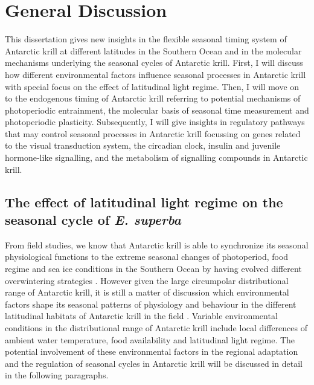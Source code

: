 
\chapter{General Discussion} %

\label{Discussion} %

This dissertation gives new insights in the flexible seasonal timing system of
Antarctic krill at different latitudes in the Southern Ocean and in the
molecular mechanisms underlying the seasonal cycles of Antarctic krill. First,
I will discuss how different environmental factors influence seasonal processes
in Antarctic krill with special focus on the effect of latitudinal light
regime. Then, I will move on to the endogenous timing of Antarctic krill
referring to potential mechanisms of photoperiodic entrainment, the molecular
basis of seasonal time measurement and photoperiodic plasticity. Subsequently,
I will give insights in regulatory pathways that may control seasonal processes
in Antarctic krill focussing on genes related to the visual transduction
system, the circadian clock, insulin and juvenile hormone-like signalling, and
the metabolism of signalling compounds in Antarctic krill.


\section{The effect of latitudinal light regime on the seasonal cycle of \textit{E. superba}}

From field studies, we know that Antarctic krill is able to synchronize its
seasonal physiological functions to the extreme seasonal changes of
photoperiod, food regime and sea ice conditions in the Southern Ocean by having
evolved different overwintering strategies \citep{ericson_seasonal_2018,
hellessey_seasonal_2018, meyer_seasonal_2010, seear_seasonal_2012,
siegel_krill_2012}. However given the large circumpolar distributional range of
Antarctic krill, it is still a matter of discussion which environmental factors
shape its seasonal patterns of physiology and behaviour in the different
latitudinal habitats of Antarctic krill in the field
\citep{kawaguchi_male_2007, schmidt_feeding_2014, seear_seasonal_2012,
spiridonov_spatial_1995}. Variable environmental conditions in the
distributional range of Antarctic krill include local differences of ambient
water temperature, food availability and latitudinal light regime. The
potential involvement of these environmental factors in the regional adaptation
and the regulation of seasonal cycles in Antarctic krill will be discussed in
detail in the following paragraphs.

